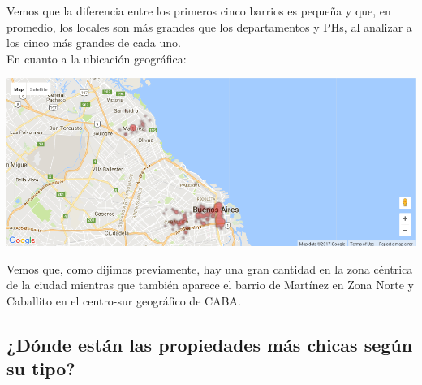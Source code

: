 \documentclass[a4paper, 10pt]{article}
\newcommand\tab[1][0.5cm]{\hspace*{#1}}
\begin{document}
				  	\tab Vemos que la diferencia entre los primeros cinco barrios es pequeña y que, en promedio, los locales son
				  	más grandes que los departamentos y PHs, al analizar a los cinco más grandes de cada uno. \\
				  	\tab En cuanto a la ubicación geográfica:
				  	\begin{center}
   		    				\includegraphics[width=\textwidth]{images/storeSurfaceTopMap}
				  	\end{center}
				  	\tab Vemos que, como dijimos previamente, hay una gran cantidad en la zona céntrica de la ciudad mientras que
				  	también aparece el barrio de Martínez en Zona Norte y Caballito en el centro-sur geográfico de CABA.
			\subsection{¿Dónde están las propiedades más chicas según su tipo?}
\end{document}

